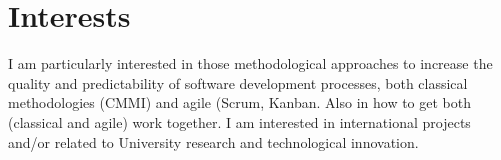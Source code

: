 \documentclass[letterpaper]{twentysecondcv} %
\begin{document}







\makeprofile %


\section{Interests}

I am particularly interested in those methodological approaches to increase the quality and predictability of software development processes, both classical methodologies (CMMI) and agile (Scrum, Kanban. Also in how to get both (classical and agile) work together.
I am interested in international projects and/or related to University research and technological innovation.


\end{document}
